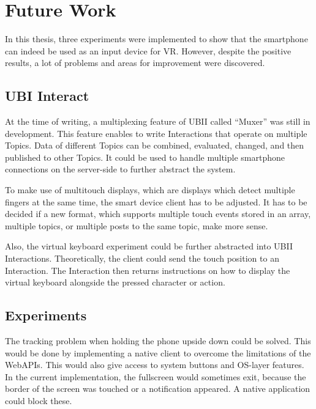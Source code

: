 \chapter{Future Work}\label{chapter:future-work}

In this thesis, three experiments were implemented to show that the smartphone can indeed be used as an input device for \ac{VR}. However, despite the positive results, a lot of problems and areas for improvement were discovered.  %


\section{UBI Interact}\label{section:fw-ubii}

At the time of writing, a multiplexing feature of \ac{UBII} called \enquote{Muxer} was still in development. This feature enables to write Interactions that operate on multiple Topics. Data of different Topics can be combined, evaluated, changed, and then published to other Topics. It could be used to handle multiple smartphone connections on the server-side to further abstract the system.

To make use of multitouch displays, which are displays which detect multiple fingers at the same time, the smart device client has to be adjusted. It has to be decided if a new format, which supports multiple touch events stored in an array, multiple topics, or multiple posts to the same topic, make more sense.

Also, the virtual keyboard experiment could be further abstracted into \ac{UBII} Interactions. Theoretically, the client could send the touch position to an Interaction. The Interaction then returns instructions on how to display the virtual keyboard alongside the pressed character or action.


\section{Experiments}\label{section:fw-experiments}

The tracking problem when holding the phone upside down could be solved. This would be done by implementing a native client to overcome the limitations of the Web\acp{API}. This would also give access to system buttons and \ac{OS}-layer features. In the current implementation, the fullscreen would sometimes exit, because the border of the screen was touched or a notification appeared. A native application could block these.

